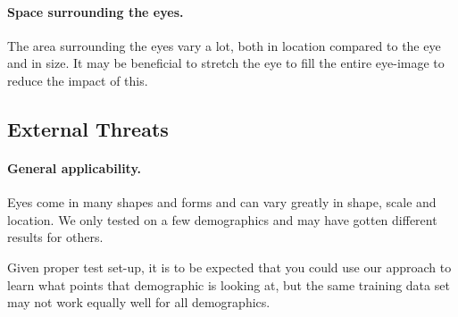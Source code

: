 \paragraph{Space surrounding the eyes.}
The area surrounding the eyes vary a lot, both in location compared to the eye and in size. 
It may be beneficial to stretch the eye to fill the entire eye-image to reduce the impact of this.

\subsection{External Threats}
\paragraph{General applicability.}
Eyes come in many shapes and forms and can vary greatly in shape, scale and location.
We only tested on a few demographics and may have gotten different results for others.

Given proper test set-up, it is to be expected that you could use our approach to learn what points that demographic is looking at, but the same training data set may not work equally well for all demographics.